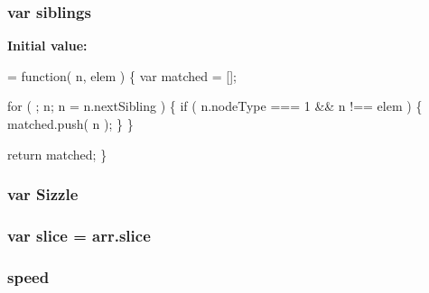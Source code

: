 \subsubsection[{\texorpdfstring{siblings}{siblings}}]{\setlength{\rightskip}{0pt plus 5cm}var siblings}\hypertarget{jquery-3_82_81_8js_aed1722084bdf05669183b96b509f4393}{}\label{jquery-3_82_81_8js_aed1722084bdf05669183b96b509f4393}
{\bfseries Initial value\+:}
\begin{DoxyCode}
= \textcolor{keyword}{function}( n, elem ) \{
    var matched = [];

    \textcolor{keywordflow}{for} ( ; n; n = n.nextSibling ) \{
        \textcolor{keywordflow}{if} ( n.nodeType === 1 && n !== elem ) \{
            matched.push( n );
        \}
    \}

    \textcolor{keywordflow}{return} matched;
\}
\end{DoxyCode}
\subsubsection[{\texorpdfstring{Sizzle}{Sizzle}}]{\setlength{\rightskip}{0pt plus 5cm}var Sizzle}\hypertarget{jquery-3_82_81_8js_ad64f9ab8a505a539fba7865107a51874}{}\label{jquery-3_82_81_8js_ad64f9ab8a505a539fba7865107a51874}
\subsubsection[{\texorpdfstring{slice}{slice}}]{\setlength{\rightskip}{0pt plus 5cm}var slice = arr.\+slice}\hypertarget{jquery-3_82_81_8js_acab0c09ac73e7a3c85a21fa773e9b8b0}{}\label{jquery-3_82_81_8js_acab0c09ac73e7a3c85a21fa773e9b8b0}
\subsubsection[{\texorpdfstring{speed}{speed}}]{ speed}\hypertarget{jquery-3_82_81_8js_add98c90065e6563cba26ff6d2016c46c}{}\label{jquery-3_82_81_8js_add98c90065e6563cba26ff6d2016c46c}
